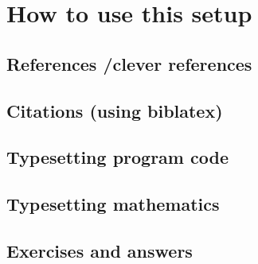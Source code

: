 \chapter{How to use this setup}\label{ch:howtouse}

\section{References /clever references}

\section{Citations (using biblatex)}

\section{Typesetting program code}

\section{Typesetting mathematics}

\section{Exercises and answers}
